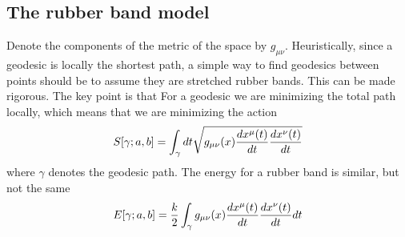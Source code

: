 \documentclass[nofootinbib,preprint,floatfix,titlepage,superscriptaddress]{revtex4} %
\begin{document}
\subsection{The rubber band model}
Denote the components of the metric of the space by $g_{\mu\nu}$. 
Heuristically, since a geodesic is locally the shortest path, a simple way to find geodesics between points should be to assume they are stretched rubber bands. This can be made rigorous. The key point is that For a geodesic we are minimizing the total path locally, which means that we are minimizing the action
\begin{equation}
    S[\gamma;a,b] =\int_\gamma dt \sqrt{ g_{\mu\nu}(x) {dx^\mu(t)\over dt}{dx^\nu(t)\over dt}}  \label{eq:Sdl}
\end{equation} 
where $\gamma$ denotes the geodesic path. The energy for a rubber band is similar, but not the same
\begin{equation}
E[\gamma;a,b]= {k\over 2}\int_\gamma g_{\mu\nu}(x) {dx^\mu(t)\over dt}{dx^\nu(t)\over dt} dt \label{eq:Ekx2}
\end{equation}
\end{document}
